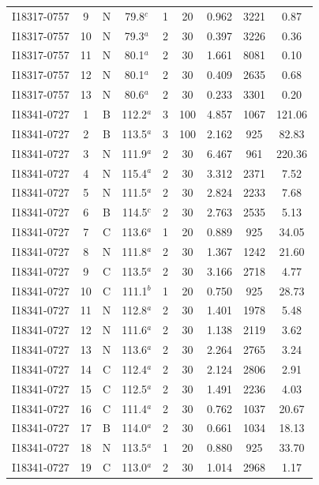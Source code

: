 \begin{table}
\begin{tabular}{ccccccccc}
I18317-0757 & 9 & N & 79.8$^{c}$ & 1 & 20 & 0.962 & 3221 & 0.87 \\
I18317-0757 & 10 & N & 79.3$^{a}$ & 2 & 30 & 0.397 & 3226 & 0.36 \\
I18317-0757 & 11 & N & 80.1$^{a}$ & 2 & 30 & 1.661 & 8081 & 0.10 \\
I18317-0757 & 12 & N & 80.1$^{a}$ & 2 & 30 & 0.409 & 2635 & 0.68 \\
I18317-0757 & 13 & N & 80.6$^{a}$ & 2 & 30 & 0.233 & 3301 & 0.20 \\
I18341-0727 & 1 & B & 112.2$^{a}$ & 3 & 100 & 4.857 & 1067 & 121.06 \\
I18341-0727 & 2 & B & 113.5$^{a}$ & 3 & 100 & 2.162 & 925 & 82.83 \\
I18341-0727 & 3 & N & 111.9$^{a}$ & 2 & 30 & 6.467 & 961 & 220.36 \\
I18341-0727 & 4 & N & 115.4$^{a}$ & 2 & 30 & 3.312 & 2371 & 7.52 \\
I18341-0727 & 5 & N & 111.5$^{a}$ & 2 & 30 & 2.824 & 2233 & 7.68 \\
I18341-0727 & 6 & B & 114.5$^{c}$ & 2 & 30 & 2.763 & 2535 & 5.13 \\
I18341-0727 & 7 & C & 113.6$^{a}$ & 1 & 20 & 0.889 & 925 & 34.05 \\
I18341-0727 & 8 & N & 111.8$^{a}$ & 2 & 30 & 1.367 & 1242 & 21.60 \\
I18341-0727 & 9 & C & 113.5$^{a}$ & 2 & 30 & 3.166 & 2718 & 4.77 \\
I18341-0727 & 10 & C & 111.1$^{b}$ & 1 & 20 & 0.750 & 925 & 28.73 \\
I18341-0727 & 11 & N & 112.8$^{a}$ & 2 & 30 & 1.401 & 1978 & 5.48 \\
I18341-0727 & 12 & N & 111.6$^{a}$ & 2 & 30 & 1.138 & 2119 & 3.62 \\
I18341-0727 & 13 & N & 113.6$^{a}$ & 2 & 30 & 2.264 & 2765 & 3.24 \\
I18341-0727 & 14 & C & 112.4$^{a}$ & 2 & 30 & 2.124 & 2806 & 2.91 \\
I18341-0727 & 15 & C & 112.5$^{a}$ & 2 & 30 & 1.491 & 2236 & 4.03 \\
I18341-0727 & 16 & C & 111.4$^{a}$ & 2 & 30 & 0.762 & 1037 & 20.67 \\
I18341-0727 & 17 & B & 114.0$^{a}$ & 2 & 30 & 0.661 & 1034 & 18.13 \\
I18341-0727 & 18 & N & 113.5$^{a}$ & 1 & 20 & 0.880 & 925 & 33.70 \\
I18341-0727 & 19 & C & 113.0$^{a}$ & 2 & 30 & 1.014 & 2968 & 1.17 \\

\end{tabular}
\end{table}
